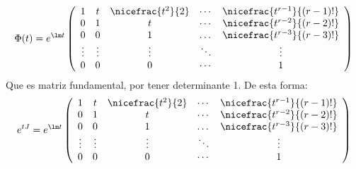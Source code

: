 \begin{enumerate}
\begin{enumerate}
                \begin{equation*}
                    \Phi(t) = e^{\lm t} \left(\begin{array}{ccccc}
                            1 & t & \nicefrac{t^2}{2} & \cdots & \nicefrac{t^{r-1}}{(r-1)!} \\
                            0 & 1 & t & \cdots & \nicefrac{t^{r-2}}{(r-2)!}\\
                            0 & 0 & 1 & \dots &  \nicefrac{t^{r-3}}{(r-3)!}\\
                            \vdots & \vdots & \vdots & \ddots & \vdots\\
                            0 & 0 & 0 & \cdots & 1
                    \end{array}\right)
                \end{equation*}
                Que es matriz fundamental, por tener determinante 1. De esta forma:
                \begin{equation*}
                    e^{tJ} = e^{\lm t}\left(\begin{array}{ccccc}
                            1 & t & \nicefrac{t^2}{2} & \cdots & \nicefrac{t^{r-1}}{(r-1)!} \\
                            0 & 1 & t & \cdots & \nicefrac{t^{r-2}}{(r-2)!}\\
                            0 & 0 & 1 & \dots &  \nicefrac{t^{r-3}}{(r-3)!}\\
                            \vdots & \vdots & \vdots & \ddots & \vdots\\
                            0 & 0 & 0 & \cdots & 1
                    \end{array}\right)
                \end{equation*}
        \end{enumerate}


\end{enumerate}
